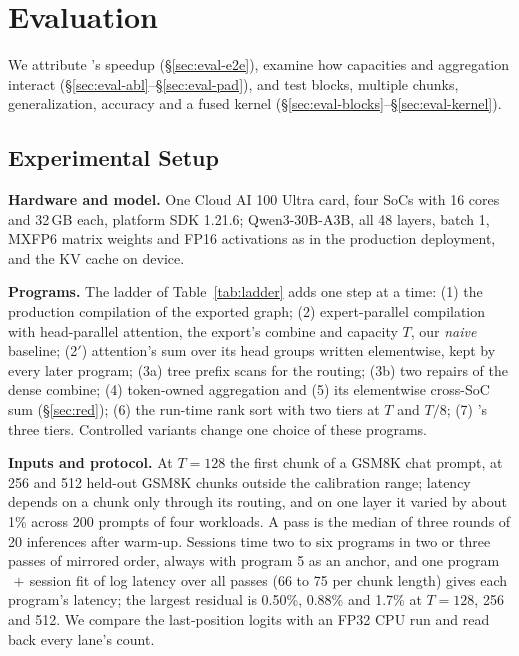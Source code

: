 \section{Evaluation}
\label{sec:eval}

We attribute \sys's speedup (\S\ref{sec:eval-e2e}), examine how capacities and aggregation interact
(\S\ref{sec:eval-abl}--\S\ref{sec:eval-pad}), and test blocks, multiple chunks, generalization, accuracy and a fused kernel
(\S\ref{sec:eval-blocks}--\S\ref{sec:eval-kernel}).

\subsection{Experimental Setup}
\label{sec:setup}

\textbf{Hardware and model.} One Cloud AI 100 Ultra card, four SoCs with 16 cores and 32\,GB each, platform SDK 1.21.6;
Qwen3-30B-A3B, all 48 layers, batch 1, MXFP6 matrix weights and FP16 activations as in the production deployment, and the
KV cache on device.

\textbf{Programs.} The ladder of Table~\ref{tab:ladder} adds one step at a time: (1) the production compilation of the
exported graph; (2) expert-parallel compilation with head-parallel attention, the export's combine and capacity $T$, our
\emph{naive \naive} baseline; (2$'$) attention's sum over its head groups written elementwise, kept by every later
program; (3a) tree prefix scans for the routing; (3b) two repairs of the dense combine; (4) token-owned aggregation and
(5) its elementwise cross-SoC sum (\S\ref{sec:red}); (6) the run-time rank sort with two tiers at $T$ and $T/8$; (7) \sys's
three tiers. Controlled variants change one choice of these programs.

\textbf{Inputs and protocol.} At $T=128$ the first chunk of a GSM8K chat prompt, at 256 and 512 held-out GSM8K chunks
outside the calibration range; latency depends on a chunk only through its routing, and on one layer it varied by about
1\% across 200 prompts of four workloads. A pass is the median of three rounds of 20 inferences after warm-up. Sessions
time two to six programs in two or three passes of mirrored order, always with program 5 as an anchor, and one
program$\,+\,$session fit of log latency over all passes (66 to 75 per chunk length) gives each program's latency; the
largest residual is 0.50\%, 0.88\% and 1.7\% at $T=128$, 256 and 512. We compare the last-position logits with an FP32 CPU run and read back every lane's count.

